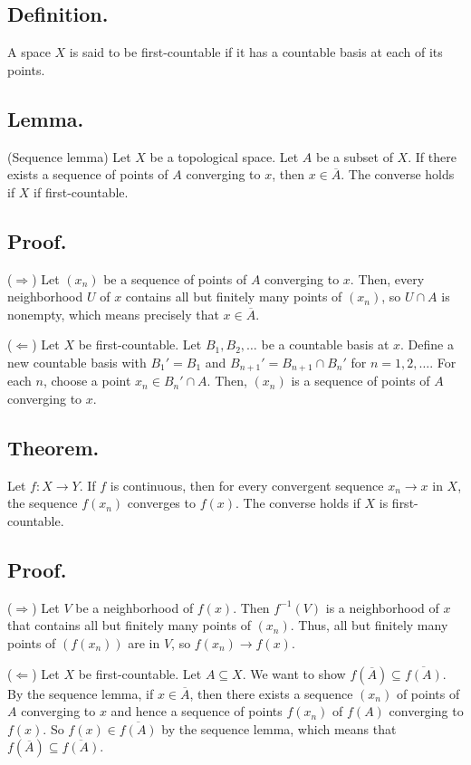 \documentclass[titlepage]{article}
\begin{document}
\subsection{Definition.} A space $X$ is said to be first-countable if it has a countable basis at each of its points.

\subsection{Lemma.} (Sequence lemma) Let $X$ be a topological space. Let $A$ be a subset of $X$. If there exists a sequence of points of $A$ converging to $x$, then $x \in \overline{A}$. The converse holds if $X$ if first-countable.

\subsection{Proof.}

($\Rightarrow$) Let $(x_{n})$ be a sequence of points of $A$ converging to $x$. Then, every neighborhood $U$ of $x$ contains all but finitely many points of $(x_{n})$, so $U \cap A$ is nonempty, which means precisely that $x \in \overline{A}$.

($\Leftarrow$) Let $X$ be first-countable. Let $B_{1}, B_{2}, \ldots$ be a countable basis at $x$. Define a new countable basis with $B_{1}' = B_{1}$ and $B_{n+1}' = B_{n+1} \cap B_{n}'$ for $n = 1, 2, \ldots$. For each $n$, choose a point $x_{n} \in B_{n}' \cap A$. Then, $(x_{n})$ is a sequence of points of $A$ converging to $x$.

\subsection{Theorem.} Let $f: X \to Y$. If $f$ is continuous, then for every convergent sequence $x_{n} \to x$ in $X$, the sequence $f(x_{n})$ converges to $f(x)$. The converse holds if $X$ is first-countable.

\subsection{Proof.}

($\Rightarrow$) Let $V$ be a neighborhood of $f(x)$. Then $f^{-1}(V)$ is a neighborhood of $x$ that contains all but finitely many points of $(x_{n})$. Thus, all but finitely many points of $(f(x_{n}))$ are in $V$, so $f(x_{n}) \to f(x)$.

($\Leftarrow$) Let $X$ be first-countable. Let $A \subseteq X$. We want to show $f(\overline{A}) \subseteq \overline{f(A)}$. By the sequence lemma, if $x \in \overline{A}$, then there exists a sequence $(x_{n})$ of points of $A$ converging to $x$ and hence a sequence of points $f(x_{n})$ of $f(A)$ converging to $f(x)$. So $f(x) \in \overline{f(A)}$ by the sequence lemma, which means that $f(\overline{A}) \subseteq \overline{f(A)}$.
\end{document}
